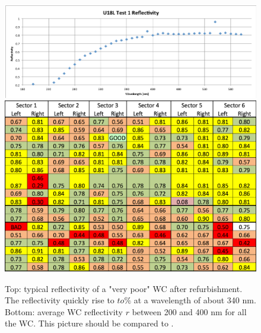 \begin{figure}
	\centering
	\includegraphics[width=1.0\columnwidth,keepaspectratio]{img/winstoConeSample1Reflectivity.png}
	\includegraphics[width=1.0\columnwidth,keepaspectratio]{img/wcStatusAfter.png}
	\caption{Top: typical reflectivity of a "very poor" WC after refurbishment. The reflectivity quickly rise to $to\%$ at a wavelength of about 340 nm. Bottom: average WC reflectivity  $r$ between 200 and 400 nm for
				all the WC. This picture should be compared to . }
	\label{fig:wcStatusAfter}
\end{figure}


